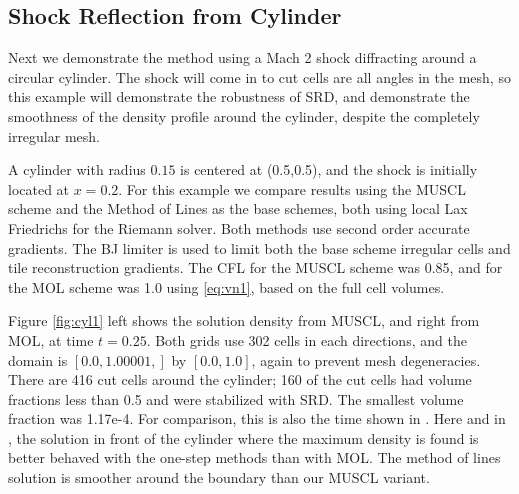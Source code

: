 \subsection{Shock Reflection from  Cylinder}
Next we demonstrate the method using a Mach 2
shock diffracting around a circular cylinder. 
The shock will come in to cut cells are all angles in the mesh, so this
example will demonstrate the robustness of SRD, and demonstrate the
smoothness of the density profile around the cylinder, despite the
completely irregular mesh.

A cylinder with radius $0.15$ is centered at
(0.5,0.5), and the shock is initially located at $x = 0.2$.
For this example we compare results using the MUSCL scheme and
the Method of Lines as the base schemes, both using local Lax Friedrichs for the Riemann
solver. Both methods use second order accurate gradients. The BJ 
limiter is used to limit
both the base scheme irregular cells  and tile reconstruction gradients. 
The CFL for the MUSCL scheme was 0.85, and for the MOL
scheme was 1.0 using \eqref{eq:vn1}, based on the full cell volumes.

Figure \ref{fig:cyl1} left shows the solution density from MUSCL, and
right from MOL, at time $t=0.25$. 
Both grids use 302 cells in each
directions, and the domain is  $[0.0,1.00001,]$ by  $[0.0, 1.0]$, again to
prevent mesh degeneracies.
There are 416 cut cells
around the cylinder; 160 of the cut cells had volume fractions less than
0.5 and were stabilized with SRD.  The smallest volume fraction was 1.17e-4.   
For comparison, this is also the time shown in \cite{mjb-hel-rjl:hbox2}. 
Here and in \cite{mjb-hel-rjl:hbox2}, the solution in front of the cylinder 
where the
maximum density is found is better behaved with the one-step methods than with
MOL.  The method of lines solution is smoother around the boundary than our
MUSCL variant. 

